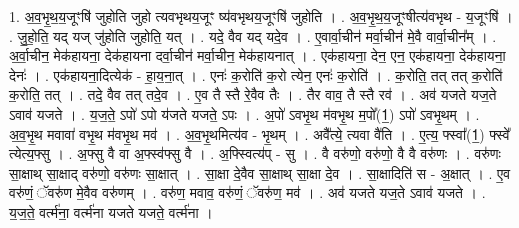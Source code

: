 \documentclass[17pt]{extarticle}
\begin{document}
1. अ॒व॒भृ॒थ॒य॒जूꣳषि॑ जुहोति जुहो त्यवभृथय॒जूꣳ ष्य॑वभृथय॒जूꣳषि॑ जुहोति । . अ॒व॒भृ॒थ॒य॒जूꣳषीत्य॑वभृथ - य॒जूꣳषि॑ । . जु॒हो॒ति॒ यद् यज् जु॑होति जुहोति॒ यत् । . यदे॒ वैव यद् यदे॒व । . ए॒वार्वा॒चीन॑ मर्वा॒चीन॑ मे॒वै वार्वा॒चीन᳚म् । . अ॒र्वा॒चीन॒ मेक॑हायना॒ देक॑हायना दर्वा॒चीन॑ मर्वा॒चीन॒ मेक॑हायनात् । . एक॑हायना॒ देन॒ एन॒ एक॑हायना॒ देक॑हायना॒ देनः॑ । . एक॑हायना॒दित्येक॑ - हा॒य॒ना॒त् । . एनः॑ क॒रोति॑ क॒रो त्येन॒ एनः॑ क॒रोति॑ । . क॒रोति॒ तत् तत् क॒रोति॑ क॒रोति॒ तत् । . तदे॒ वैव तत् तदे॒व । . ए॒व तै स्तै रे॒वैव तैः । . तैर वाव॒ तै स्तै रव॑ । . अव॑ यजते यज॒ते ऽवाव॑ यजते । . य॒ज॒ते॒ ऽपो॑ ऽपो य॑जते यजते॒ ऽपः । . अ॒पो॑ ऽवभृ॒थ म॑वभृ॒थ म॒पो᳚(1॒) ऽपो॑ ऽवभृ॒थम् । . अ॒व॒भृ॒थ मवावा॑ वभृ॒थ म॑वभृ॒थ मव॑ । . अ॒व॒भृ॒थमित्य॑व - भृ॒थम् । . अवै᳚त्ये॒ त्यवा वै॑ति । . ए॒त्य॒ फ्स्वा᳚(1॒) फ्स्वे᳚ त्येत्य॒फ्सु । . अ॒फ्सु वै वा अ॒फ्स्व॑फ्सु वै । . अ॒फ्स्वित्य॑प् - सु । . वै वरु॑णो॒ वरु॑णो॒ वै वै वरु॑णः । . वरु॑णः सा॒क्षाथ् सा॒क्षाद् वरु॑णो॒ वरु॑णः सा॒क्षात् । . सा॒क्षा दे॒वैव सा॒क्षाथ् सा॒क्षा दे॒व । . सा॒क्षादिति॑ स - अ॒क्षात् । . ए॒व वरु॑णं॒ ॅवरु॑ण मे॒वैव वरु॑णम् । . वरु॑ण॒ मवाव॒ वरु॑णं॒ ॅवरु॑ण॒ मव॑ । . अव॑ यजते यज॒ते ऽवाव॑ यजते । . य॒ज॒ते॒ वर्त्म॑ना॒ वर्त्म॑ना यजते यजते॒ वर्त्म॑ना । \newline
\end{document}
